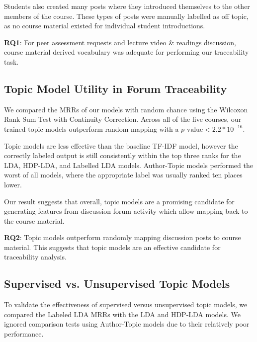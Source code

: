 \documentclass[sigconf, nonacm=true]{acmart}
\begin{document}
Students also created many posts where they introduced themselves to the other members of the course. 
These types of posts were manually labelled as off topic, as no course material existed for individual student introductions.

\begin{tcolorbox}[sharp corners, top=1mm, bottom=1mm]
\textbf{RQ1}: For peer assessment requests and lecture video \& readings discussion, course material derived vocabulary was adequate for performing our traceability task.
\end{tcolorbox}

\subsection{Topic Model Utility in Forum Traceability}
We compared the MRRs of our models with random chance using the Wilcoxon Rank Sum Test with Continuity Correction.
Across all of the five courses, our trained topic models outperform random mapping with a $p\text{-value} < 2.2 * 10^{-16}$.

Topic models are less effective than the baseline TF-IDF model, however the correctly labeled output is still consistently within the top three ranks for the LDA, HDP-LDA, and Labelled LDA models. Author-Topic models performed the worst of all models, where the appropriate label was usually ranked ten places lower. %

Our result suggests that overall, topic models are a promising candidate for generating features from discussion forum activity which allow mapping back to the course material. %


\begin{tcolorbox}[sharp corners, top=1mm, bottom=1mm]
\textbf{RQ2}: Topic models outperform randomly mapping discussion posts to course material. This suggests that topic models are an effective candidate for traceability analysis.
\end{tcolorbox}

\subsection{Supervised vs. Unsupervised Topic Models}

To validate the effectiveness of supervised versus unsupervised topic models, we compared the Labeled LDA MRRs with the LDA and HDP-LDA models.
We ignored comparison tests using Author-Topic models due to their relatively poor performance.
\end{document}
